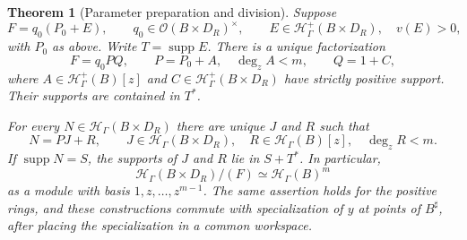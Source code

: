 \documentclass[11pt,letterpaper]{article}
\newtheorem{theorem}{Theorem}[section]
\theoremstyle{definition}
\theoremstyle{remark}
\newcommand{\OO}{\mathcal O}
\newcommand{\HH}{\mathcal H}
\newcommand{\supp}{\operatorname{supp}}
\newcommand{\sh}{^{\sharp}}
\newcommand{\Hp}{\HH^{+}_{\Gamma}}
\newcommand{\Hh}{\HH_{\Gamma}}
\begin{document}
\begin{theorem}[Parameter preparation and division]\label{thm:parameterprep}
Suppose
\[
 F=q_0(P_0+E),\qquad
 q_0\in\OO(B\times D_R)^\times,
 \qquad E\in\Hp(B\times D_R),\quad v(E)>0,
\]
with $P_0$ as above. Write $T=\supp E$. There is a unique factorization
\begin{equation}\label{eq:parameterprep}
 F=q_0P Q,\qquad
 P=P_0+A,\quad \deg_z A<m,\qquad Q=1+C,
\end{equation}
where $A\in\Hp(B)[z]$ and $C\in\Hp(B\times D_R)$ have strictly positive support. Their supports are contained in $T^*$.

For every $N\in\Hh(B\times D_R)$ there are unique $J$ and $R$ such that
\begin{equation}\label{eq:parameterdivision}
 N=PJ+R,\qquad J\in\Hh(B\times D_R),\quad
 R\in\Hh(B)[z],\quad\deg_zR<m.
\end{equation}
If $\supp N=S$, the supports of $J$ and $R$ lie in $S+T^*$. In particular,
\[
 \Hh(B\times D_R)/(F)\simeq\Hh(B)^m
\]
as a module with basis $1,z,\ldots,z^{m-1}$. The same assertion holds for the positive rings, and these constructions commute with specialization of $y$ at points of $B\sh$, after placing the specialization in a common workspace.
\end{theorem}
\end{document}
